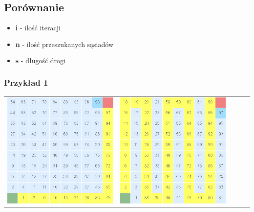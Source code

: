 \documentclass{article}
\begin{document}
\subsection{Porównanie}

\begin{itemize}
\item \textbf{i} - ilość iteracji
\item \textbf{n} - ilość przeszukanych sąsiadów
\item \textbf{s} - długość drogi
\end{itemize}

\subsubsection{Przykład 1}
\begin{center}
\begin{tabular}{c c c c c}
\includegraphics[scale=0.15]{images/scr.png} &
\includegraphics[scale=0.15]{images/scr1.png} &

\end{tabular}
\end{center}
\end{document}
